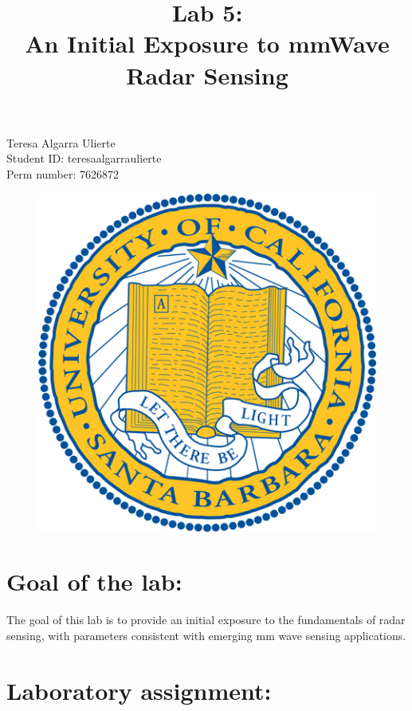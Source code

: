 \documentclass[a4paper,11pt]{article}
\title{\bfseries Lab 5: \\ An Initial Exposure to mmWave Radar Sensing\\}
\date{}
\begin{document}
\renewcommand\contentsname{\vspace{-1cm}}
\maketitle
\lstset{language=Matlab}

\begin{centering}
    Teresa Algarra Ulierte \\
    Student ID: teresaalgarraulierte \\
    Perm number: 7626872 \\
\end{centering}

\vspace{3cm}

\begin{figure}[!ht]
	\centering
	\includegraphics[scale = 5]{images/portada.jpeg}
\end{figure}

\newpage

\section{Goal of the lab:}

The goal of this lab is to provide an initial exposure to the fundamentals of radar
sensing, with parameters consistent with emerging mm wave sensing applications.

\section{Laboratory assignment:}
\end{document}
